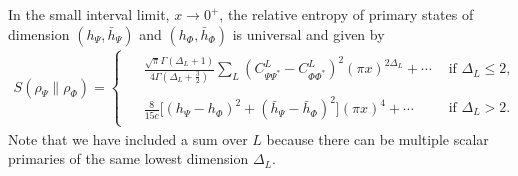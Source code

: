 \documentclass[11pt]{article}
\newcommand{\lb}{\left(}
\newcommand{\rb}{\right)}
\begin{document}
  In the small interval limit, $x\to 0^+$, the relative entropy of primary states of dimension 
  $(h_\Psi,\bar{h}_\Psi)$ and $(h_\Phi,\bar{h}_\Phi)$
  is universal and given by  
\begin{align}\label{Ssmallx}
\boxed{
S(\rho_\Psi\|\rho_\Phi)
=
\begin{cases}
\begin{aligned}
&\frac{\sqrt{\pi}\Gamma(\Delta_L+1)}
{4\Gamma(\Delta_L+\frac32)}
\sum_L
(C^L_{\Psi\Psi^*}-C^L_{\Phi\Phi^*})^2 
(\pi x)^{2\Delta_L}
+\cdots
\end{aligned}
&
\text{if }\Delta_L\le 2,
\\[2ex]
\begin{aligned}
&\frac{8}{15c}
\Big[
(h_\Psi-h_\Phi)^2 
+(\bar h_\Psi-\bar h_\Phi)^2
\Big]
(\pi x)^4
+\cdots
\end{aligned}
&
\text{if }\Delta_L>2 .
\end{cases}
}
\end{align}
Note that we have included a sum over $L$ because there can be multiple scalar primaries of the same lowest dimension $\Delta_L$.
\end{document}
